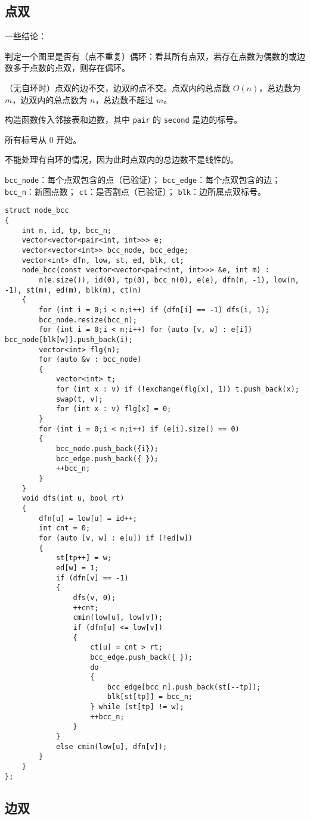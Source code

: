 \documentclass[12pt]{ctexart}
\begin{document}
\subsection{点双}

一些结论：

判定一个图里是否有（点不重复）偶环：看其所有点双，若存在点数为偶数的或边数多于点数的点双，则存在偶环。

（无自环时）点双的边不交，边双的点不交。点双内的总点数 $O(n)$，总边数为 $m$，边双内的总点数为 $n$，总边数不超过 $m$。

构造函数传入邻接表和边数，其中 \verb|pair| 的 \verb|second| 是边的标号。

所有标号从 $0$ 开始。

不能处理有自环的情况，因为此时点双内的总边数不是线性的。

\verb|bcc_node|：每个点双包含的点（已验证）；
\verb|bcc_edge|：每个点双包含的边；
\verb|bcc_n|：新图点数；
\verb|ct|：是否割点（已验证）；
\verb|blk|：边所属点双标号。

\begin{lstlisting}
struct node_bcc
{
	int n, id, tp, bcc_n;
	vector<vector<pair<int, int>>> e;
	vector<vector<int>> bcc_node, bcc_edge;
	vector<int> dfn, low, st, ed, blk, ct;
	node_bcc(const vector<vector<pair<int, int>>> &e, int m) :
		n(e.size()), id(0), tp(0), bcc_n(0), e(e), dfn(n, -1), low(n, -1), st(m), ed(m), blk(m), ct(n)
	{
		for (int i = 0;i < n;i++) if (dfn[i] == -1) dfs(i, 1);
		bcc_node.resize(bcc_n);
		for (int i = 0;i < n;i++) for (auto [v, w] : e[i]) bcc_node[blk[w]].push_back(i);
		vector<int> flg(n);
		for (auto &v : bcc_node)
		{
			vector<int> t;
			for (int x : v) if (!exchange(flg[x], 1)) t.push_back(x);
			swap(t, v);
			for (int x : v) flg[x] = 0;
		}
		for (int i = 0;i < n;i++) if (e[i].size() == 0)
		{
			bcc_node.push_back({i});
			bcc_edge.push_back({ });
			++bcc_n;
		}
	}
	void dfs(int u, bool rt)
	{
		dfn[u] = low[u] = id++;
		int cnt = 0;
		for (auto [v, w] : e[u]) if (!ed[w])
		{
			st[tp++] = w;
			ed[w] = 1;
			if (dfn[v] == -1)
			{
				dfs(v, 0);
				++cnt;
				cmin(low[u], low[v]);
				if (dfn[u] <= low[v])
				{
					ct[u] = cnt > rt;
					bcc_edge.push_back({ });
					do
					{
						bcc_edge[bcc_n].push_back(st[--tp]);
						blk[st[tp]] = bcc_n;
					} while (st[tp] != w);
					++bcc_n;
				}
			}
			else cmin(low[u], dfn[v]);
		}
	}
};
\end{lstlisting}

\subsection{边双}
\end{document}
